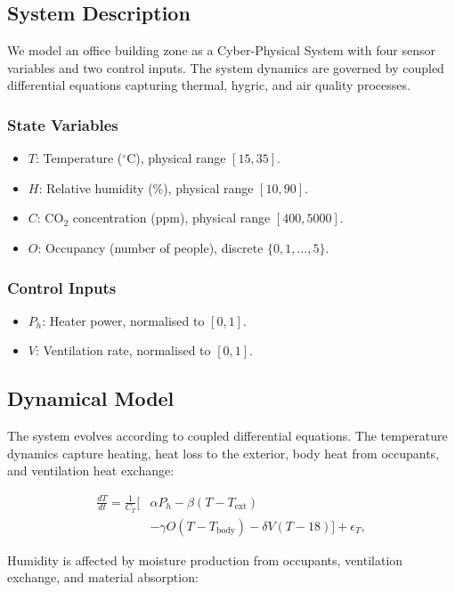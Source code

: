 \documentclass[conference]{IEEEtran}
\begin{document}
\subsection{System Description}
We model an office building zone as a Cyber-Physical System with four sensor variables and two control inputs. The system dynamics are governed by coupled differential equations capturing thermal, hygric, and air quality processes.

\subsubsection{State Variables}
\begin{itemize}[nosep]
\item $T$: Temperature ($^\circ$C), physical range $[15, 35]$.
\item $H$: Relative humidity (\%), physical range $[10, 90]$.
\item $C$: CO$_2$ concentration (ppm), physical range $[400, 5000]$.
\item $O$: Occupancy (number of people), discrete $\{0, 1, \dots, 5\}$.
\end{itemize}

\subsubsection{Control Inputs}
\begin{itemize}[nosep]
\item $P_h$: Heater power, normalised to $[0, 1]$.
\item $V$: Ventilation rate, normalised to $[0, 1]$.
\end{itemize}

\subsection{Dynamical Model}
The system evolves according to coupled differential equations. The temperature dynamics capture heating, heat loss to the exterior, body heat from occupants, and ventilation heat exchange:

\begin{align}
\frac{dT}{dt} = \frac{1}{C_T}\Big[&\alpha P_h - \beta(T - T_{\text{ext}}) \nonumber\\
&- \gamma O(T - T_{\text{body}}) - \delta V(T - 18)\Big] + \epsilon_T,
\label{eq:dT}
\end{align}

Humidity is affected by moisture production from occupants, ventilation exchange, and material absorption:
\end{document}
